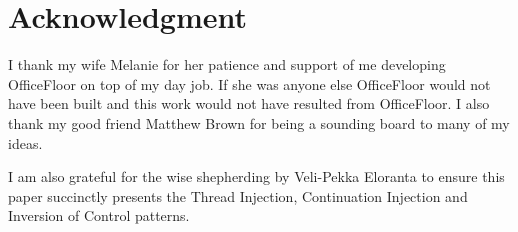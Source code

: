 \documentclass[prodmode]{style/acmlarge}
\begin{document}
\section*{Acknowledgment} I thank my wife Melanie for her patience and support
of me developing OfficeFloor on top of my day job.  If she was anyone else
OfficeFloor would not have been built and this work would not have resulted from
OfficeFloor.  I also thank my good friend Matthew Brown for being a sounding
board to many of my ideas.

I am also grateful for the wise shepherding by Veli-Pekka Eloranta to ensure
this paper succinctly presents the Thread Injection, Continuation Injection and
Inversion of Control patterns.




\end{document}
